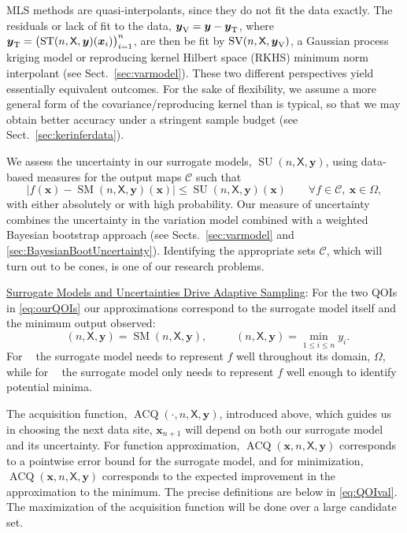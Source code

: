 \documentclass[11pt]{NSFamsart}
\newcommand{\Upara}[1]{\noindent\underline{\upshape #1}:}
\DeclareMathOperator{\SURR}{SM} %
\DeclareMathOperator{\STREND}{ST} %
\DeclareMathOperator{\SVAR}{SV} %
\newcommand{\MLS}{\textrm{MLS}\xspace} %
\DeclareMathOperator{\VAL}{ACQ}
\DeclareMathOperator{\MIN}{MIN}
\DeclareMathOperator{\ID}{ID}
\DeclareMathOperator{\APPMIN}{\widehat{\MIN}}
\DeclareMathOperator{\APPID}{\widehat{\ID}}
\DeclareMathOperator{\SURRERR}{SU}
\newcommand{\TREND}{\textup{T}}
\newcommand{\VAR}{\textup{V}}
\newcommand{\mX}{\mathsf{X}}
\newcommand{\bx}{{\boldsymbol{x}}}
\newcommand{\by}{{\boldsymbol{y}}}
\newcommand{\calc}{{\mathcal{C}}}
\def\abs#1{\ensuremath{\left \lvert #1 \right \rvert}}
\begin{document}
\MLS methods are quasi-interpolants, since they do not fit the data exactly.  
The residuals or lack of fit to the data, $\by_{\VAR} = \by - \by_{\TREND}$, where $\by_{\TREND} = \bigl( \STREND(n,\mX,\by)(\bx_i) \bigr)_{i=1}^n$, are then be fit by $\SVAR(n,\mX,\by_{\VAR})$, a Gaussian process kriging model or reproducing kernel Hilbert space (RKHS) minimum norm interpolant (see Sect.\ \ref{sec:varmodel}).  These two different perspectives yield essentially equivalent outcomes.  For the sake of flexibility, we assume a more general form of the covariance/reproducing kernel than is typical, so that we may obtain better accuracy under a stringent sample budget (see Sect.\ \ref{sec:kerinferdata}).  

We assess the uncertainty in  our surrogate models, $\SURRERR(n,\mX,\by)$, using data-based measures for the output maps $\calc$ such that 
\begin{equation} \label{eq:surrUncert}
    \abs{f(\bx)-\SURR(n,\mX,\by)(\bx)} \le \SURRERR(n,\mX,\by)(\bx) \qquad \forall f \in \calc,\ \bx \in \Omega,
\end{equation}
with either absolutely or with high probability.  Our measure of uncertainty combines the uncertainty in the variation model combined with a weighted Bayesian bootstrap approach (see Sects.\ \ref{sec:varmodel} and \ref{sec:BayesianBootUncertainty}).  Identifying the appropriate sets $\calc$, which will turn out to be cones, is one of our research problems.

\Upara{Surrogate Models and Uncertainties Drive Adaptive Sampling} 
For the two QOIs in \eqref{eq:ourQOIs} our approximations correspond to the surrogate model itself and the minimum output observed:
\begin{equation} \label{eq:QOIhat}
    \APPID(n,\mX,\by) = \SURR(n,\mX,\by), \qquad \APPMIN(n,\mX,\by) = \min_{1 \le i \le n} y_i.
\end{equation}
For $\APPID$ the surrogate model needs to represent $f$ well throughout its domain, $\Omega$, while for $\APPMIN$ the surrogate model only needs to represent $f$ well enough to identify potential minima.

The acquisition function, $\VAL(\cdot,n,\mX, \by)$, introduced above, which guides us in choosing the next data site, $\bx_{n+1}$ will depend on both our surrogate model and its uncertainty.  For function approximation, $\VAL(\bx,n,\mX, \by)$ corresponds to a pointwise error bound for the surrogate model, and for  minimization,  $\VAL(\bx,n,\mX, \by)$ corresponds to the expected improvement in the approximation to the minimum.  The precise definitions are below in  \eqref{eq:QOIval}.  The maximization of the acquisition function will be done over a large candidate set.
\end{document}
